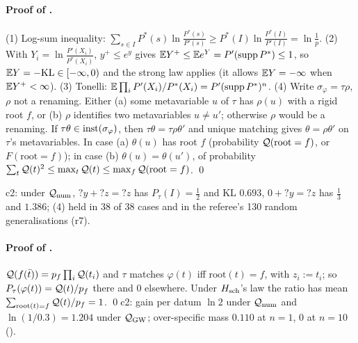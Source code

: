 \paragraph{Proof of .} (1) Log-sum inequality: $\sum_{s\in I}P^*(s)\ln\frac{P^*(s)}{P'(s)}\ge P^*(I)\ln\frac{P^*(I)}{P'(I)}=\ln\frac1p$. (2) With $Y_i=\ln\frac{P'(X_i)}{P^*(X_i)}$, $y^+\le e^y$ gives $\mathbb{E} Y^+\le\mathbb{E} e^Y=P'(\operatorname{supp}P^*)\le1$, so $\mathbb{E} Y=-\mathrm{KL}\in[-\infty,0)$ and the strong law applies (it allows $\mathbb{E} Y=-\infty$ when $\mathbb{E} Y^+<\infty$). (3) Tonelli: $\mathbb{E}\prod_iP'(X_i)/P^*(X_i)=P'(\operatorname{supp}P^*)^n$. (4) Write $\sigma_\varphi=\tau\rho$, $\rho$ not a renaming. Either (a) some metavariable $u$ of $\tau$ has $\rho(u)$ with a rigid root $f$, or (b) $\rho$ identifies two metavariables $u\neq u'$; otherwise $\rho$ would be a renaming. If $\tau\theta\in\mathrm{inst}(\sigma_\varphi)$, then $\tau\theta=\tau\rho\theta'$ and unique matching gives $\theta=\rho\theta'$ on $\tau$'s metavariables. In case (a) $\theta(u)$ has root $f$ (probability $\mathcal{Q}(\mathrm{root}=f)$, or $F(\mathrm{root}=f)$); in case (b) $\theta(u)=\theta(u')$, of probability $\sum_t\mathcal{Q}(t)^2\le\max_t\mathcal{Q}(t)\le\max_f\mathcal{Q}(\mathrm{root}=f)$. \qed

c2: under $\mathcal{Q}_{\mathrm{num}}$, ${?y}+{?z}={?z}$ has $P_\tau(I)=\tfrac12$ and KL $0.693$, $0+{?y}={?z}$ has $\tfrac13$ and $1.386$; (4) held in 38 of 38 cases and in the referee's 130 random generalisations (r7).

\paragraph{Proof of .} $\mathcal{Q}(f(\bar t))=p_f\prod_i\mathcal{Q}(t_i)$ and $\tau$ matches $\varphi(t)$ iff $\mathrm{root}(t)=f$, with $z_i:=t_i$; so $P_\tau(\varphi(t))=\mathcal{Q}(t)/p_f$ there and $0$ elsewhere. Under $H_{\mathrm{sch}}$'s law the ratio has mean $\sum_{\mathrm{root}(t)=f}\mathcal{Q}(t)/p_f=1$. \qed c2: gain per datum $\ln2$ under $\mathcal{Q}_{\mathrm{num}}$ and $\ln(1/0.3)=1.204$ under $\mathcal{Q}_{\mathrm{GW}}$; over-specific mass $0.110$ at $n=1$, $0$ at $n=10$ ().

